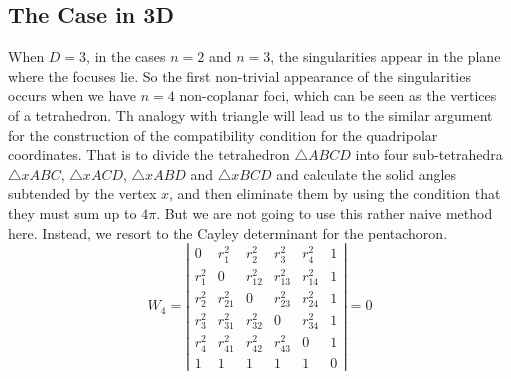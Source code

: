 \documentclass{article}
\begin{document}
\subsection{The Case in 3D}
\label{sec-1-5}
 When $D=3$, in the cases $n=2$ and $n=3$, the singularities appear in the plane where the focuses lie. 
So the first non-trivial appearance of the singularities occurs when we have $n=4$ non-coplanar foci, which can be seen as the vertices of a tetrahedron. 
Th analogy with triangle will lead us to the similar argument for the construction of the compatibility condition for the quadripolar coordinates. 
That is to divide the tetrahedron $\triangle ABCD$ into four sub-tetrahedra $\triangle xABC$, $\triangle xACD$, $\triangle xABD$ and $\triangle xBCD$ and calculate the solid angles subtended by the vertex $x$, and then eliminate them by using the condition that they must sum up to $4\pi$. 
But we are not going to use this rather naive method here. Instead, we resort to the Cayley determinant for the pentachoron.
\begin{equation}
\label{eq:vol_det}
W_4=
\left|\begin{array}{cccccc}
0 & r_{1}^2 & r_{2}^2 & r_{3}^2 & r_{4}^2 & 1 \\
r_{1}^2 & 0 & r_{12}^2 & r_{13}^2 & r_{14}^2 & 1 \\
r_{2}^2 & r_{21}^2 & 0 & r_{23}^2 & r_{24}^2 & 1 \\
r_{3}^2 & r_{31}^2 & r_{32}^2 & 0 & r_{34}^2 & 1 \\
r_{4}^2 & r_{41}^2 & r_{42}^2 & r_{43}^2 & 0 & 1 \\
1 & 1 & 1 & 1 & 1 & 0  
\end{array}\right|
=0
\end{equation}
\end{document}
